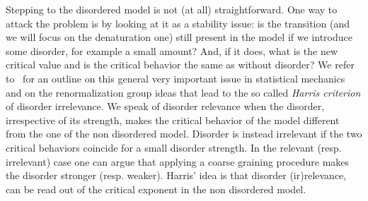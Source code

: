 \documentclass[11pt]{article}
\theoremstyle{definition}
\numberwithin{equation}{section}
\numberwithin{figure}{section}
\numberwithin{table}{section}
\begin{document}
Stepping to the disordered model is not (at all) straightforward. One way to attack the problem is by looking at it as a stability issue: is the transition (and we will focus on the denaturation one) still present in the model if we introduce some disorder, for example a small amount? And, if it does, what is the new critical value and is the critical behavior the same as without disorder? We refer to~\cite[Chapter~5]{cf:GB} for an outline on this general very important issue in statistical mechanics and on the renormalization group ideas that lead to the so called \emph{Harris criterion} of disorder irrelevance. We speak of disorder relevance when the disorder, irrespective of its strength, makes the critical behavior of the model different from the one of the non disordered model. Disorder is instead irrelevant if the two critical behaviors coincide for a small disorder strength. In the relevant (resp. irrelevant) case one can argue that applying a coarse graining procedure makes the disorder stronger (resp. weaker). Harris' idea is that disorder (ir)relevance, can be read out of the critical exponent in the non disordered model.
\end{document}
